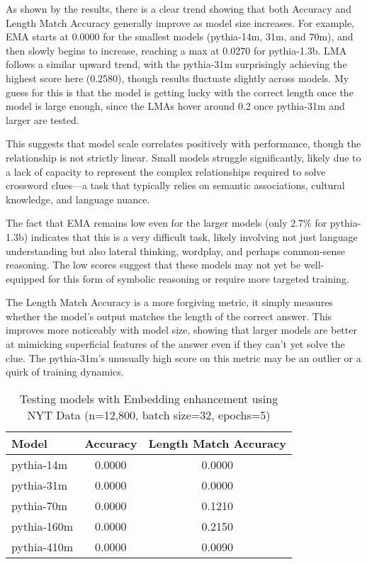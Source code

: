 \documentclass[
	a4paper, %
	10pt, %
	unnumberedsections, %
	twoside, %
]{LTJournalArticle}
\begin{document}
As shown by the results, there is a clear trend showing that both Accuracy and Length Match Accuracy generally improve as model size increases. For example, EMA starts at 0.0000 for the smallest models (pythia-14m, 31m, and 70m), and then slowly begins to increase, reaching a max at 0.0270 for pythia-1.3b. LMA follows a similar upward trend, with the pythia-31m surprisingly achieving the highest score here (0.2580), though results fluctuate slightly across models. My guess for this is that the model is getting lucky with the correct length once the model is large enough, since the LMAs hover around 0.2 once pythia-31m and larger are tested.

This suggests that model scale correlates positively with performance, though the relationship is not strictly linear. Small models struggle significantly, likely due to a lack of capacity to represent the complex relationships required to solve crossword clues—a task that typically relies on semantic associations, cultural knowledge, and language nuance.

The fact that EMA remains low even for the larger models (only 2.7\% for pythia-1.3b) indicates that this is a very difficult task, likely involving not just language understanding but also lateral thinking, wordplay, and perhaps common-sense reasoning. The low scores suggest that these models may not yet be well-equipped for this form of symbolic reasoning or require more targeted training.

The Length Match Accuracy is a more forgiving metric, it simply measures whether the model's output matches the length of the correct answer. This improves more noticeably with model size, showing that larger models are better at mimicking superficial features of the answer even if they can't yet solve the clue. The pythia-31m’s unusually high score on this metric may be an outlier or a quirk of training dynamics.


\begin{table}[h] %
	\centering
	\begin{tabular}{l c c}
		\toprule
		Model & Accuracy & Length Match Accuracy \\
		\midrule
		pythia-14m & 0.0000 & 0.0000 \\
		pythia-31m & 0.0000 & 0.0000 \\
		pythia-70m & 0.0000 & 0.1210 \\
		pythia-160m & 0.0000 & 0.2150 \\
		pythia-410m & 0.0000 & 0.0090\\
		\bottomrule
	\end{tabular}
	\label{tab:embeddingtest}
	\caption{Testing models with Embedding enhancement using NYT Data (n=12,800, batch size=32, epochs=5)}
\end{table}
\end{document}
